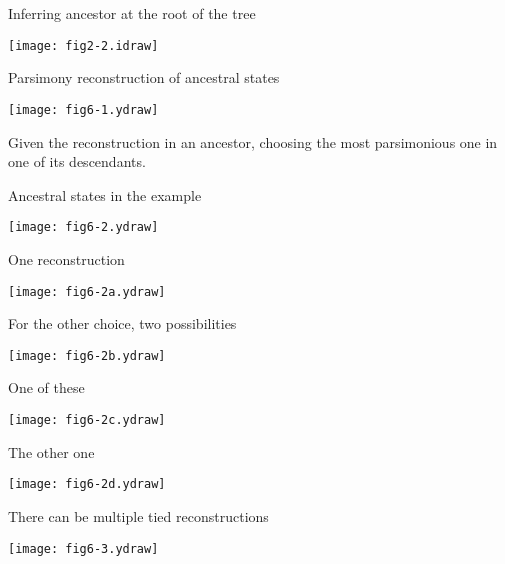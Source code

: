 \documentclass[bluish,slideColor,colorBG,pdf]{prosper}
\begin{document}
\begin{slide}[Replace]{Inferring ancestor at the root of the tree}

\centerline{\texttt{[image: fig2-2.idraw]}}
\bigskip

\end{slide}

\begin{slide}[Replace]{Parsimony reconstruction of ancestral states}

\centerline{\texttt{[image: fig6-1.ydraw]}}
\bigskip

Given the reconstruction in an ancestor, choosing the most parsimonious one in
one of its descendants.

\end{slide}

\begin{slide}[Replace]{Ancestral states in the example}

\centerline{\texttt{[image: fig6-2.ydraw]}}

\end{slide}

\begin{slide}[Replace]{One reconstruction}

\centerline{\texttt{[image: fig6-2a.ydraw]}}

\end{slide}

\begin{slide}[Replace]{For the other choice, two possibilities}

\centerline{\texttt{[image: fig6-2b.ydraw]}}

\end{slide}

\begin{slide}[Replace]{One of these}

\centerline{\texttt{[image: fig6-2c.ydraw]}}

\end{slide}

\begin{slide}[Replace]{The other one}

\centerline{\texttt{[image: fig6-2d.ydraw]}}

\end{slide}

\begin{slide}[Replace]{There can be multiple tied reconstructions}

\centerline{\texttt{[image: fig6-3.ydraw]}}

\end{slide}
\end{document}
